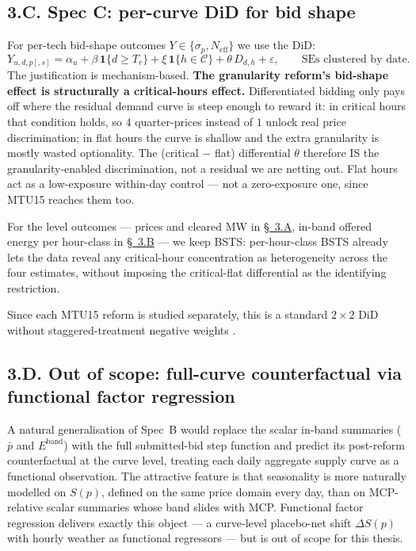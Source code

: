 \documentclass[11pt]{article}
\begin{document}
\subsection*{3.C. Spec C: per-curve DiD for bid shape}\label{sec:did}
For per-tech bid-shape outcomes $Y\in\{\sigma_p, N_{\text{eff}}\}$ we use the DiD:
\[
Y_{u,d,p[,s]} = \alpha_u + \beta\,\mathbf{1}\{d\ge T_r\} + \xi\,\mathbf{1}\{h\in\mathcal{C}\} + \theta\,D_{d,h} + \varepsilon, \qquad \text{SEs clustered by date.}
\]
The justification is mechanism-based. \textbf{The granularity reform's bid-shape effect is structurally a critical-hours effect.} Differentiated bidding only pays off where the residual demand curve is steep enough to reward it: in critical hours that condition holds, so $4$ quarter-prices instead of $1$ unlock real price discrimination; in flat hours the curve is shallow and the extra granularity is mostly wasted optionality. The (critical $-$ flat) differential $\theta$ therefore IS the granularity-enabled discrimination, not a residual we are netting out. Flat hours act as a low-exposure within-day control --- not a zero-exposure one, since MTU15 reaches them too.

For the level outcomes --- prices and cleared MW in \hyperref[sec:bsts]{\S~3.A}, in-band offered energy per hour-class in \hyperref[sec:smart_desc]{\S~3.B} --- we keep BSTS: per-hour-class BSTS already lets the data reveal any critical-hour concentration as heterogeneity across the four estimates, without imposing the critical-flat differential as the identifying restriction.

Since each MTU15 reform is studied separately, this is a standard $2\times 2$ DiD without staggered-treatment negative weights \citep[ch.~3]{de_chaisemartin_2026}.

\subsection*{3.D. Out of scope: full-curve counterfactual via functional factor regression}
\label{sec:fbr}
A natural generalisation of Spec~B would replace the scalar in-band summaries ($\bar p$ and $E^{\text{band}}$) with the full submitted-bid step function and predict its post-reform counterfactual at the curve level, treating each daily aggregate supply curve as a functional observation. The attractive feature is that seasonality is more naturally modelled on $S(p)$, defined on the same price domain every day, than on MCP-relative scalar summaries whose band slides with MCP. Functional factor regression \citep{otto_winter_2025} delivers exactly this object --- a curve-level placebo-net shift $\Delta S(p)$ with hourly weather as functional regressors --- but is out of scope for this thesis.
\end{document}
